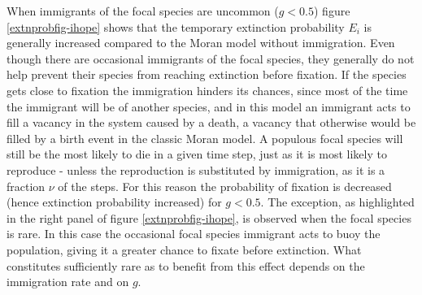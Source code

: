 When immigrants of the focal species are uncommon ($g<0.5$) figure \ref{extnprobfig-ihope} shows that the temporary extinction probability $E_i$ is generally increased compared to the Moran model without immigration. 
Even though there are occasional immigrants of the focal species, they generally do not help prevent their species from reaching extinction before fixation. 
If the species gets close to fixation the immigration hinders its chances, since most of the time the immigrant will be of another species, and in this model an immigrant acts to fill a vacancy in the system caused by a death, a vacancy that otherwise would be filled by a birth event in the classic Moran model. 
A populous focal species will still be the most likely to die in a given time step, just as it is most likely to reproduce - unless the reproduction is substituted by immigration, as it is a fraction $\nu$ of the steps. 
For this reason the probability of fixation is decreased (hence extinction probability increased) for $g<0.5$. 
The exception, as highlighted in the right panel of figure \ref{extnprobfig-ihope}, is observed when the focal species is rare. 
In this case the occasional focal species immigrant acts to buoy the population, giving it a greater chance to fixate before extinction. 
What constitutes sufficiently rare as to benefit from this effect depends on the immigration rate and on $g$. %
